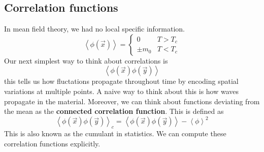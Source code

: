\subsection{Correlation functions} 
In mean field theory, we had no local specific information. 
\[
	\left< \phi ( \vec{x} )  \right> =  \begin{cases}
		0 & T > T_c \\
		\pm m_0 & T < T_c 
	\end{cases}
\] Our next simplest way to think about correlations is
\[
	\left< \phi ( \vec{x} ) \phi ( \vec{y} )  \right>
\] this tells us how fluctations propagate throughout time by encoding spatial
variations at multiple points. A naive way to 
think about this is how waves propagate in the material. 
Moreover, we can think about functions deviating from the mean
as the \textbf{connected correlation function}. 
This is defined as 
\[
	\left< \phi ( \vec{x} ) \phi( \vec{y} )  \right>_c = \left< \phi( \vec{x} ) \phi ( \vec{y} )  \right> - \left< \phi  \right>^2 
\] This is also known as the cumulant in statistics. 
We can compute these correlation functions explicitly. 

